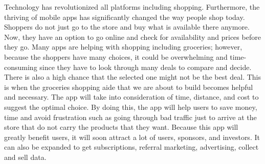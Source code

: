 Technology has revolutionized all platforms including shopping. Furthermore, the thriving of mobile apps has significantly changed the way people shop today. Shoppers do not just go to the store and buy what is available there anymore. Now, they have an option to go online and check for availability and prices before they go. Many apps are helping with shopping including groceries; however, because the shoppers have many choices, it could be overwhelming and time-consuming since they have to look through many deals to compare and decide. There is also a high chance that the selected one might not be the best deal. This is when the groceries shopping aide that we are about to build becomes helpful and necessary. The app will take into consideration of time, distance, and cost to suggest the optimal choice. By doing this, the app will help users to save money, time and avoid frustration such as going through bad traffic just to arrive at the store that do not carry the products that they want. Because this app will greatly benefit users, it will soon attract a lot of users, sponsors, and investors. It can also be expanded to get subscriptions, referral marketing, advertising, collect and sell data.